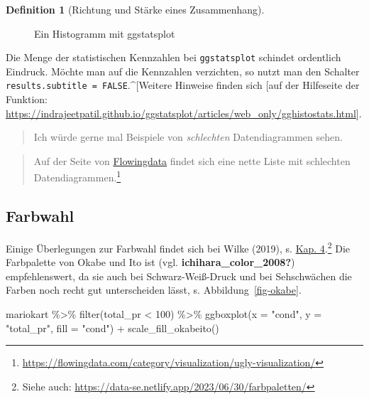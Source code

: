 \documentclass[
  a4paper,
  DIV=11]{scrreprt}
\newenvironment{Shaded}{\begin{snugshade}}{\end{snugshade}}
\newcommand{\AttributeTok}[1]{\textcolor[rgb]{0.40,0.45,0.13}{#1}}
\newcommand{\DecValTok}[1]{\textcolor[rgb]{0.68,0.00,0.00}{#1}}
\newcommand{\FunctionTok}[1]{\textcolor[rgb]{0.28,0.35,0.67}{#1}}
\newcommand{\NormalTok}[1]{\textcolor[rgb]{0.00,0.23,0.31}{#1}}
\newcommand{\SpecialCharTok}[1]{\textcolor[rgb]{0.37,0.37,0.37}{#1}}
\newcommand{\StringTok}[1]{\textcolor[rgb]{0.13,0.47,0.30}{#1}}
\theoremstyle{definition}
\theoremstyle{definition}
\theoremstyle{definition}
\newtheorem{definition}{Definition}[chapter]
\theoremstyle{remark}
\begin{document}
\begin{definition}[Richtung und Stärke eines
Zusammenhang]
\begin{figure}[H]
{}

\caption{\label{fig-ggstatsplot}Ein Histogramm mit ggstatsplot}

\end{figure}%

Die Menge der statistischen Kennzahlen bei \texttt{ggstatsplot} schindet
ordentlich Eindruck. Möchte man auf die Kennzahlen verzichten, so nutzt
man den Schalter \texttt{results.subtitle\ =\ FALSE}.\^{}{[}Weitere
Hinweise finden sich {[}auf der Hilfeseite der Funktion:
\url{https://indrajeetpatil.github.io/ggstatsplot/articles/web_only/gghistostats.html}{]}.

\begin{quote}
{} Ich würde gerne mal Beispiele von \emph{schlechten}
Datendiagrammen sehen.
\end{quote}

\begin{quote}
{} Auf der Seite von
\href{https://flowingdata.com/category/visualization/ugly-visualization/}{Flowingdata}
findet sich eine nette Liste mit schlechten Datendiagrammen.\footnote{\url{https://flowingdata.com/category/visualization/ugly-visualization/}}
\end{quote}

\subsection{Farbwahl}\label{sec-farbwahl}

Einige Überlegungen zur Farbwahl findet sich bei Wilke (2019), s.
\href{https://clauswilke.com/dataviz/color-basics.html}{Kap.
4}.\footnote{Siehe auch:
  \url{https://data-se.netlify.app/2023/06/30/farbpaletten/}} Die
Farbpalette von Okabe und Ito ist (vgl. \textbf{ichihara\_color\_2008?})
empfehlenswert, da sie auch bei Schwarz-Weiß-Druck und bei Sehschwächen
die Farben noch recht gut unterscheiden lässt, s.
Abbildung~\ref{fig-okabe}.

\begin{Shaded}
\begin{Highlighting}[]
\NormalTok{mariokart }\SpecialCharTok{\%\textgreater{}\%} 
  \FunctionTok{filter}\NormalTok{(total\_pr }\SpecialCharTok{\textless{}} \DecValTok{100}\NormalTok{) }\SpecialCharTok{\%\textgreater{}\%} 
  \FunctionTok{ggboxplot}\NormalTok{(}\AttributeTok{x =} \StringTok{"cond"}\NormalTok{, }\AttributeTok{y =} \StringTok{"total\_pr"}\NormalTok{, }\AttributeTok{fill =} \StringTok{"cond"}\NormalTok{) }\SpecialCharTok{+}
  \FunctionTok{scale\_fill\_okabeito}\NormalTok{()}
\end{Highlighting}
\end{Shaded}


\end{definition}
\end{document}
